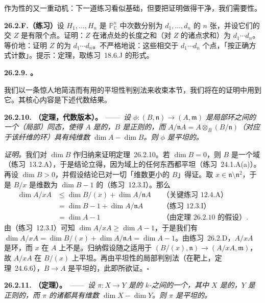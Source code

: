 作为\trCM{}性的又一重动机：下一道练习看似基础，但要把证明做得干净，我们需要\trCM{}性。

\textbf{26.2.F.（练习）}\quad 设 $H_1,\dots,H_n$ 是 $\mathbb{P}^n_{\mathbb{C}}$ 中次数分别为 $d_1,\dots,d_n$ 的 $n$ 张\trHypersurface，并设它们的\trSchemeTheoretic{}交 $Z$ 是有限个点。证明：$Z$ 在诸点处的长度之和（对 $Z$ 的诸点求和）为 $d_1\cdots d_n$。等价地：证明 $Z$ 的\trLength{}为 $d_1\cdots d_n$。不严格地说：这些\trHypersurface{}相交于 $d_1\cdots d_n$ 个点，「按正确方式计数」。提示：\trBezout{}定理，取\mbox{练习~18.6.J} 的形式。

\textbf{26.2.9. \trMiracleFlat。}

我们以一条惊人地简洁而有用的平坦性判别法来收束本节，我们将在\trSerreDuality{}的证明中用到它。其核心内容是下述代数结果。

\textbf{26.2.10. \trhTheorem（\trMiracleFlat{}定理，代数版本）。}\ ——\ \emph{设 $\phi\colon(B,\mathfrak{n})\to(A,\mathfrak{m})$ 是\trNoether{}局部环之间的一个（局部）同态，使得 $A$ 是\trCM{}的，$B$ 是正则的，而 $A/\mathfrak{n}A=A\otimes_B(B/\mathfrak{n})$（对应于该纤维的环）具有纯维数 $\dim A-\dim B$。则 $\phi$ 是平坦的。}

\emph{证明。}\quad 我们对 $\dim B$ 作归纳来证明\mbox{定理~26.2.10}。若 $\dim B=0$，则 $B$ 是一个域（\mbox{练习~13.2.A}），于是结论立得，因为域上的任何东西都平坦（\mbox{练习~24.1.A(a)}）。再设 $\dim B>0$，并假设结论已对一切「维数更小的 $B$」得证。取 $x\in\mathfrak{n}\setminus\mathfrak{n}^2$，于是 $B/x$ 是维数为 $\dim B-1$ 的\trRegular\trLocalRing（\mbox{练习~12.3.I}）。那么
\begin{align*}
\dim A/xA &\le \dim B/(x)+\dim A/\mathfrak{n}A &&\text{（关键练习~12.4.A）}\\
&= \dim B-1+\dim A/\mathfrak{n}A &&\text{（练习~12.3.I）}\\
&= \dim A-1 &&\text{（由定理~26.2.10 的假设）}.
\end{align*}
由（\mbox{练习~12.3.I}）可知 $\dim A/xA\ge\dim A-1$，于是我们有 $\dim A/xA=\dim B/(x)+\dim A/\mathfrak{n}A=\dim A-1$。由\mbox{练习~26.2.D}，$A/xA$ 是\trCM{}环，而 $x$ 在 $A$ 上不是\trNonZerodivisor。归纳假设随之适用于 $(B/(x),\mathfrak{n})\to(A/xA,\mathfrak{m})$，故 $A/xA$ 在 $B/(x)$ 上平坦。再由平坦性的局部\trSlicing{}判别法（在靶上，\mbox{定理~24.6.6}），$B\to A$ 是平坦的，此即所欲证。\hfill$\square$

\textbf{26.2.11. \trhTheorem（\trMiracleFlat{}定理）。}\ ——\ \emph{设 $\pi\colon X\to Y$ 是\trPureDimensional{}的\trFiniteType{} $k$-\trScheme{}之间的一个\trMorphism，其中 $X$ 是\trCM{}的，$Y$ 是正则的，而 $\pi$ 的诸\trFiber{}都具有维数 $\dim X-\dim Y$。则 $\pi$ 是平坦的。}

